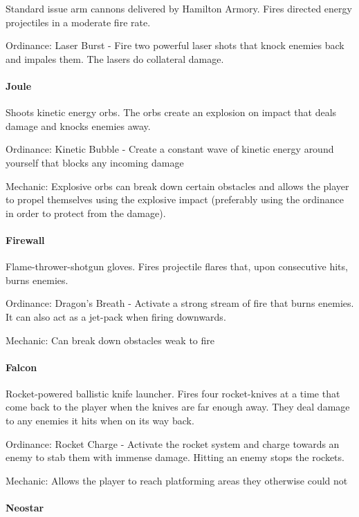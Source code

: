 \documentclass[../Main.tex]{subfiles}
\begin{document}
Standard issue arm cannons delivered by Hamilton Armory. Fires directed energy projectiles in a moderate fire rate. 

Ordinance: Laser Burst - Fire two powerful laser shots that knock enemies back and impales them. The lasers do collateral damage. 

\paragraph{Joule}

Shoots kinetic energy orbs. The orbs create an explosion on impact that deals damage and knocks enemies away. 

Ordinance: Kinetic Bubble - Create a constant wave of kinetic energy around yourself that blocks any incoming damage

Mechanic: Explosive orbs can break down certain obstacles and allows the player to propel themselves using the explosive impact (preferably using the ordinance in order to protect from the damage).

\paragraph{Firewall}

Flame-thrower-shotgun gloves. Fires projectile flares that, upon consecutive hits, burns enemies.

Ordinance: Dragon's Breath - Activate a strong stream of fire that burns enemies. It can also act as a jet-pack when firing downwards.

Mechanic: Can break down obstacles weak to fire

\paragraph{Falcon}

Rocket-powered ballistic knife launcher. Fires four rocket-knives at a time that come back to the player when the knives are far enough away. They deal damage to any enemies it hits when on its way back.

Ordinance: Rocket Charge - Activate the rocket system and charge towards an enemy to stab them with immense damage. Hitting an enemy stops the rockets. 

Mechanic: Allows the player to reach platforming areas they otherwise could not

\paragraph{Neostar}
\end{document}

